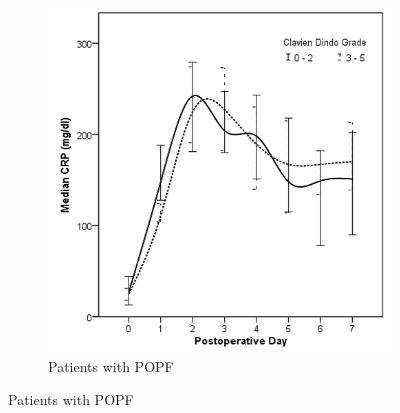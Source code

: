 \begin{figure}[t]
\begin{subfigure}{0.48\textwidth}
		\includegraphics[width=\textwidth]{Figures/crp_comp_infectious_leak1}
		\caption{Patients with POPF}
		\label{fig:crp_comp_infectious_leak1}
	\end{subfigure}
\end{figure}
\vfill


